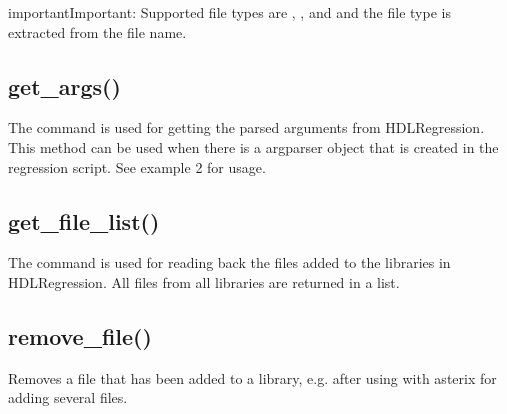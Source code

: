 \documentclass[letterpaper,10pt,english]{sphinxmanual}
\begin{document}
\begin{sphinxadmonition}{important}{Important:}
\sphinxAtStartPar
Supported file types are , ,  and  and the file type is extracted from the file name.
\end{sphinxadmonition}


\subsection{get\_args()}
\label{\detokenize{api:get-args}}
\sphinxAtStartPar
The command is used for getting the parsed arguments from HDLRegression.
This method can be used when there is a argparser object that is created in the regression script.
See {\hyperref[\detokenize{api:hdlregression}]{}} example 2 for usage.

\sphinxAtStartPar
{}

\begin{sphinxVerbatim}[commandchars=\\\{\}]
  
\end{sphinxVerbatim}


\subsection{get\_file\_list()}
\label{\detokenize{api:get-file-list}}
\sphinxAtStartPar
The command is used for reading back the files added to the libraries in HDLRegression.
All files from all libraries are returned in a list.

\sphinxAtStartPar
{}

\begin{sphinxVerbatim}[commandchars=\\\{\}]
  
\end{sphinxVerbatim}


\subsection{remove\_file()}
\label{\detokenize{api:remove-file}}
\sphinxAtStartPar
Removes a file that has been added to a library, e.g. after using  with asterix for adding several files.
\end{document}

